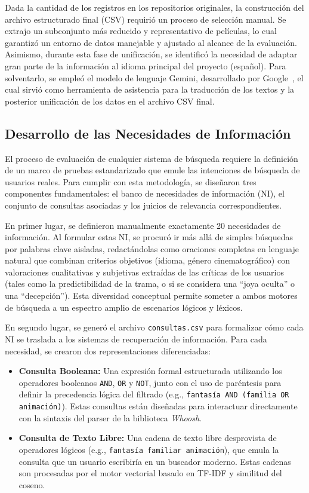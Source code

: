 \documentclass[conference,a4paper]{IEEEtran}
\begin{document}
Dada la cantidad de los registros en los repositorios originales, la construcción del archivo estructurado final (CSV) requirió un proceso de selección manual. Se extrajo un subconjunto más reducido y representativo de películas, lo cual garantizó un entorno de datos manejable y ajustado al alcance de la evaluación. Asimismo, durante esta fase de unificación, se identificó la necesidad de adaptar gran parte de la información al idioma principal del proyecto (español). Para solventarlo, se empleó el modelo de lenguaje Gemini, desarrollado por Google~\cite{b6}, el cual sirvió como herramienta de asistencia para la traducción de los textos y la posterior unificación de los datos en el archivo CSV final.

\subsection{Desarrollo de las Necesidades de Información}
El proceso de evaluación de cualquier sistema de búsqueda requiere la definición de un marco de pruebas estandarizado que emule las intenciones de búsqueda de usuarios reales. Para cumplir con esta metodología, se diseñaron tres componentes fundamentales: el banco de necesidades de información (NI), el conjunto de consultas asociadas y los juicios de relevancia correspondientes.

En primer lugar, se definieron manualmente exactamente 20 necesidades de información. Al formular estas NI, se procuró ir más allá de simples búsquedas por palabras clave aisladas, redactándolas como oraciones completas en lenguaje natural que combinan criterios objetivos (idioma, género cinematográfico) con valoraciones cualitativas y subjetivas extraídas de las críticas de los usuarios (tales como la predictibilidad de la trama, o si se considera una ``joya oculta'' o una ``decepción''). Esta diversidad conceptual permite someter a ambos motores de búsqueda a un espectro amplio de escenarios lógicos y léxicos.

En segundo lugar, se generó el archivo \texttt{consultas.csv} para formalizar cómo cada NI se traslada a los sistemas de recuperación de información. Para cada necesidad, se crearon dos representaciones diferenciadas:
\begin{itemize}
    \item \textbf{Consulta Booleana:} Una expresión formal estructurada utilizando los operadores booleanos \texttt{AND}, \texttt{OR} y \texttt{NOT}, junto con el uso de paréntesis para definir la precedencia lógica del filtrado (e.g., \texttt{fantasía AND (familia OR animación)}). Estas consultas están diseñadas para interactuar directamente con la sintaxis del parser de la biblioteca \textit{Whoosh}.
    \item \textbf{Consulta de Texto Libre:} Una cadena de texto libre desprovista de operadores lógicos (e.g., \texttt{fantasía familiar animación}), que emula la consulta que un usuario escribiría en un buscador moderno. Estas cadenas son procesadas por el motor vectorial basado en TF-IDF y similitud del coseno.
\end{itemize}
\end{document}
